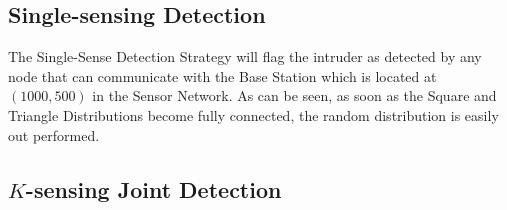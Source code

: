 \documentclass[10pt, conference, compsocconf, twocolumn]{IEEEtran}
\begin{document}
\subsection{Single-sensing Detection}
%
%

The Single-Sense Detection Strategy will flag the intruder as
detected by any node that can communicate with the Base Station
which is located at $(1000,500)$ in the Sensor Network.  As can be
seen, as soon as the Square and Triangle Distributions become fully
connected, the random distribution is easily out performed.

\subsection{$K$-sensing Joint Detection}
%
%
\end{document}
